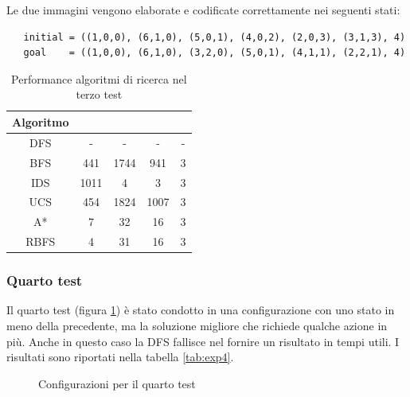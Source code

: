 \documentclass{article}
\begin{document}
	Le due immagini vengono elaborate e codificate correttamente nei seguenti stati:
	\begin{verbatim}
   initial = ((1,0,0), (6,1,0), (5,0,1), (4,0,2), (2,0,3), (3,1,3), 4)
   goal    = ((1,0,0), (6,1,0), (3,2,0), (5,0,1), (4,1,1), (2,2,1), 4)
	\end{verbatim}

	\begin{table}[H]
		\centering
		\def\arraystretch{1.5}
		\begin{tabular}{|c|c|c|c|c|}
			\hline
			\textbf{Algoritmo} & \bm{$n$} & \bm{$m$} & \bm{$\mu$} & \bm{$l$} \\
			\hline
			DFS & - & - & - & - \\
			\hline
			BFS & 441 & 1744 & 941 & 3 \\
			\hline
			IDS &  1011 & 4 & 3 & 3 \\
			\hline
			UCS &  454 & 1824 & 1007 & 3 \\
			\hline
			A* &  7 & 32 & 16 & 3 \\
			\hline
			RBFS & 4 & 31 & 16 & 3   \\
			\hline
		\end{tabular}
		\caption{Performance algoritmi di ricerca nel terzo test}
		\label{tab:exp3}
	\end{table}


	\subsubsection{Quarto test}
	Il quarto test (figura \ref{fig:exp4}) è stato condotto in una configurazione con uno stato in meno della precedente, ma la soluzione migliore che richiede qualche azione in più. Anche in questo caso la DFS fallisce nel fornire un risultato in tempi utili. I risultati sono riportati nella tabella \ref{tab:exp4}.
	\begin{figure}[H]
		\centering
		\protect\caption{Configurazioni per il quarto test}
		\label{fig:exp4}
	\end{figure}
	
\end{document}
